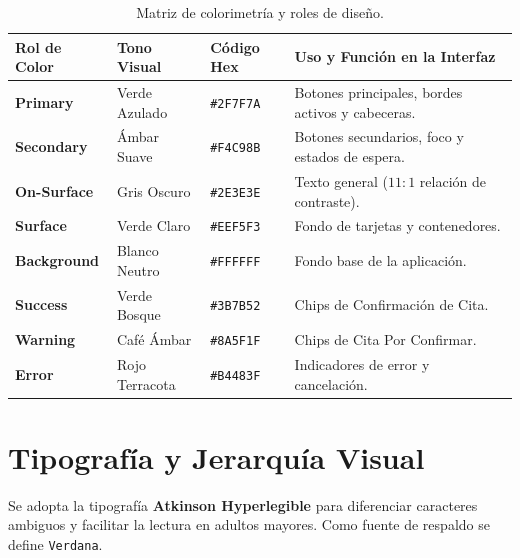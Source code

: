 \documentclass[12pt,a4paper]{article}
\begin{document}
\begin{table}[htbp]
\centering
\small
\begin{tabular}{|l|l|l|p{6.5cm}|}
\hline
\rowcolor{Superficie} \textbf{Rol de Color} & \textbf{Tono Visual} & \textbf{Código Hex} & \textbf{Uso y Función en la Interfaz} \\ \hline
\rowcolor{Primario} \color{white}\textbf{Primary} & Verde Azulado & \texttt{\#2F7F7A} & Botones principales, bordes activos y cabeceras. \\ \hline
\rowcolor{Secundario} \textbf{Secondary} & Ámbar Suave & \texttt{\#F4C98B} & Botones secundarios, foco y estados de espera. \\ \hline
\rowcolor{TextoFondo} \color{white}\textbf{On-Surface} & Gris Oscuro & \texttt{\#2E3E3E} & Texto general ($11:1$ relación de contraste). \\ \hline
\rowcolor{Superficie} \textbf{Surface} & Verde Claro & \texttt{\#EEF5F3} & Fondo de tarjetas y contenedores. \\ \hline
\rowcolor{FondoClaro} \textbf{Background} & Blanco Neutro & \texttt{\#FFFFFF} & Fondo base de la aplicación. \\ \hline
\rowcolor{Exito} \color{white}\textbf{Success} & Verde Bosque & \texttt{\#3B7B52} & Chips de Confirmación de Cita. \\ \hline
\rowcolor{Pendiente} \color{white}\textbf{Warning} & Café Ámbar & \texttt{\#8A5F1F} & Chips de Cita Por Confirmar. \\ \hline
\rowcolor{ErrorColor} \color{white}\textbf{Error} & Rojo Terracota & \texttt{\#B4483F} & Indicadores de error y cancelación. \\ \hline
\end{tabular}
\caption{Matriz de colorimetría y roles de diseño.}
\end{table}

\section{Tipografía y Jerarquía Visual}
Se adopta la tipografía \textbf{Atkinson Hyperlegible} para diferenciar caracteres ambiguos y facilitar la lectura en adultos mayores. Como fuente de respaldo se define \texttt{Verdana}.
\end{document}
